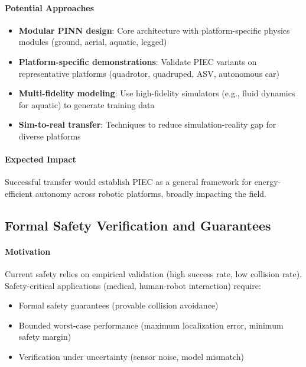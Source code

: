 \paragraph{Potential Approaches}
\begin{itemize}
    \item \textbf{Modular PINN design}: Core architecture with platform-specific physics modules (ground, aerial, aquatic, legged)
    \item \textbf{Platform-specific demonstrations}: Validate PIEC variants on representative platforms (quadrotor, quadruped, ASV, autonomous car)
    \item \textbf{Multi-fidelity modeling}: Use high-fidelity simulators (e.g., fluid dynamics for aquatic) to generate training data
    \item \textbf{Sim-to-real transfer}: Techniques to reduce simulation-reality gap for diverse platforms
\end{itemize}

\paragraph{Expected Impact}
Successful transfer would establish PIEC as a general framework for energy-efficient autonomy across robotic platforms, broadly impacting the field.

\subsection{Formal Safety Verification and Guarantees}

\paragraph{Motivation}
Current safety relies on empirical validation (high success rate, low collision rate). Safety-critical applications (medical, human-robot interaction) require:
\begin{itemize}
    \item Formal safety guarantees (provable collision avoidance)
    \item Bounded worst-case performance (maximum localization error, minimum safety margin)
    \item Verification under uncertainty (sensor noise, model mismatch)
\end{itemize}


